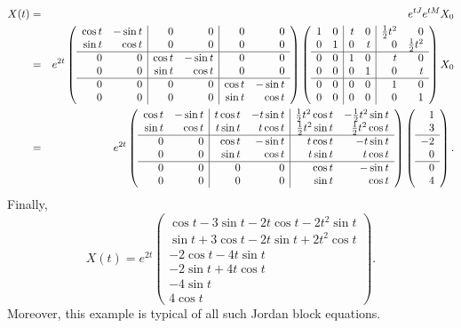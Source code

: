 \begin{eqnarray*}
X(t) & = & e^{tJ}e^{tM}X_0 \\
 & = & e^{2t}\left(\begin{array}{rr|rr|rr} 
 \cos t & -\sin t & 0 & 0 & 0 & 0\\
\sin t & \cos t & 0 & 0 & 0 & 0 \\  
 \hline
 0 & 0 & \cos t & -\sin t & 0 & 0 \\
 0 & 0 & \sin t & \cos t & 0 & 0 \\
\hline
 0 & 0 & 0 & 0 & \cos t & -\sin t\\
 0 & 0 & 0 & 0 & \sin t & \cos t  \end{array}\right) 
\left(\begin{array}{rr|rr|rr} 
 1 & 0 & t & 0 & \mbox{$\frac{1}{2}$} t^2 & 0\\
0 & 1 & 0 & t & 0 & \mbox{$\frac{1}{2}$} t^2 \\  
 \hline
 0 & 0 & 1 & 0 & t & 0 \\
 0 & 0 & 0 & 1 & 0 & t \\
\hline
 0 & 0 & 0 & 0 & 1 & 0\\
 0 & 0 & 0 & 0 & 0 & 1  \end{array}\right) X_0 \\
 & = & e^{2t}\left(\begin{array}{rr|rr|rr} 
 \cos t & -\sin t & t\cos t & -t\sin t & \mbox{$\frac{1}{2}$} t^2\cos t & -\mbox{$\frac{1}{2}$} t^2\sin t\\
\sin t & \cos t & t\sin t & t\cos t & \mbox{$\frac{1}{2}$} t^2\sin t & \mbox{$\frac{1}{2}$} t^2\cos t \\  
 \hline
 0 & 0 & \cos t & -\sin t & t\cos t & -t\sin t \\
 0 & 0 & \sin t & \cos t & t\sin t & t\cos t \\
\hline
 0 & 0 & 0 & 0 & \cos t & -\sin t\\
 0 & 0 & 0 & 0 & \sin t & \cos t  \end{array}\right)
\left(\begin{array}{r} 1 \\ 3 \\ \hline -2 \\  0 \\ \hline 0 \\ 4
\end{array}\right).
\end{eqnarray*}
Finally,
\[
X(t) = e^{2t}\left(\begin{array}{c}
\cos t - 3\sin t -2t\cos t - 2t^2\sin t \\
\sin t + 3\cos t -2t\sin t + 2t^2\cos t \\
-2\cos t - 4t\sin t \\
-2\sin t + 4t\cos t \\
-4\sin t \\ 4\cos t \end{array}\right).
\]
Moreover, this example is typical of all such Jordan block equations. 

